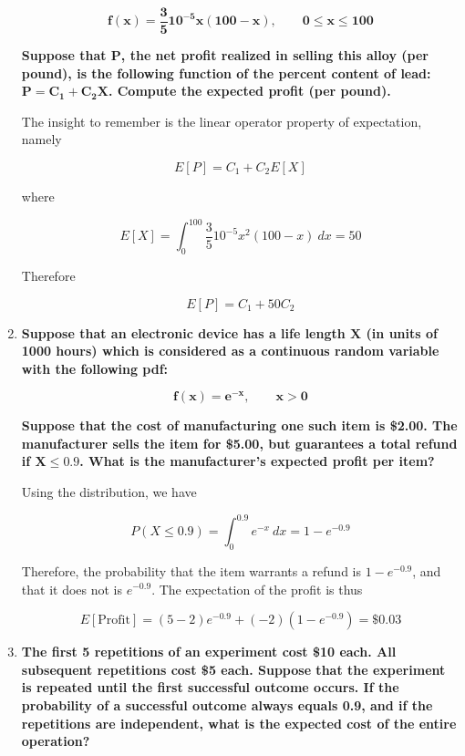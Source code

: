 \documentclass[10pt, oneside]{article}   	%
\theoremstyle{definition}
\begin{document}
\begin{enumerate}[label=7.\arabic*]
\begin{tcolorbox}[
  colback=Cerulean!5!white,
  colframe=Cerulean!75!black]
\[ \bm{f(x) = \frac{3}{5} 10^{-5} x (100-x), \qquad 0 \leq x \leq 100} \]

\textbf{Suppose that $\bm{P}$, the net profit realized in selling this alloy (per pound), is the following function of the percent content of lead: $\bm{P = C_1 + C_2 X}$. Compute the expected profit (per pound).}
\end{tcolorbox}

The insight to remember is the linear operator property of expectation, namely

\[ E[P] = C_1 + C_2 E[X] \]

where

\[ E[X] = \int^{100}_0 \frac{3}{5} 10^{-5} x^2 (100-x) \ dx = 50 \]

Therefore

\[E[P] = \boxed{C_1 + 50 C_2} \]

\item  \begin{tcolorbox}[
  colback=Cerulean!5!white,
  colframe=Cerulean!75!black]
\textbf{Suppose that an electronic device has a life length $\bm{X}$ (in units of 1000 hours) which is considered as a continuous random variable with the following pdf:}

\[ \bm{f(x) = e^{-x}, \qquad x > 0} \]

\textbf{Suppose that the cost of manufacturing one such item is \$2.00. The manufacturer sells the item for \$5.00, but guarantees a total refund if $\bm{X \leq 0.9}$. What is the manufacturer's expected profit per item?}
\end{tcolorbox}

Using the distribution, we have

\[ P(X \leq 0.9) = \int^{0.9}_0 e^{-x} \ dx = 1 - e^{-0.9} \]

Therefore, the probability that the item warrants a refund is $1 - e^{-0.9}$, and that it does not is $e^{-0.9}$. The expectation of the profit is thus

\[ E[\text{Profit}] = (5-2) e^{-0.9} + (-2) (1 - e^{-0.9}) = \boxed{\$ 0.03} \]

\item  \begin{tcolorbox}[
  colback=Cerulean!5!white,
  colframe=Cerulean!75!black]
\textbf{The first 5 repetitions of an experiment cost \$10 each. All subsequent repetitions cost \$5 each. Suppose that the experiment is repeated until the first successful outcome occurs. If the probability of a successful outcome always equals 0.9, and if the repetitions are independent, what is the expected cost of the entire operation?}
\end{tcolorbox}


\end{enumerate}
\end{document}
